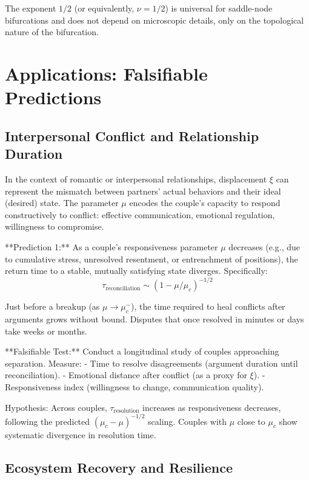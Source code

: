 \documentclass[12pt]{article}
\begin{document}
The exponent $1/2$ (or equivalently, $\nu = 1/2$) is universal for saddle-node bifurcations and does not depend on microscopic details, only on the topological nature of the bifurcation.

\section{Applications: Falsifiable Predictions}

\subsection{Interpersonal Conflict and Relationship Duration}

In the context of romantic or interpersonal relationships, displacement $\xi$ can represent the mismatch between partners' actual behaviors and their ideal (desired) state. The parameter $\mu$ encodes the couple's capacity to respond constructively to conflict: effective communication, emotional regulation, willingness to compromise.

**Prediction 1:** As a couple's responsiveness parameter $\mu$ decreases (e.g., due to cumulative stress, unresolved resentment, or entrenchment of positions), the return time to a stable, mutually satisfying state diverges. Specifically:
\begin{equation}
\tau_{\text{reconciliation}} \sim (1 - \mu/\mu_c)^{-1/2}
\end{equation}

Just before a breakup (as $\mu \to \mu_c^-$), the time required to heal conflicts after arguments grows without bound. Disputes that once resolved in minutes or days take weeks or months.

**Falsifiable Test:** Conduct a longitudinal study of couples approaching separation. Measure:
- Time to resolve disagreements (argument duration until reconciliation).
- Emotional distance after conflict (as a proxy for $\xi$).
- Responsiveness index (willingness to change, communication quality).

Hypothesis: Across couples, $\tau_{\text{resolution}}$ increases as responsiveness decreases, following the predicted $(\mu_c - \mu)^{-1/2}$ scaling. Couples with $\mu$ close to $\mu_c$ show systematic divergence in resolution time.

\subsection{Ecosystem Recovery and Resilience}
\end{document}
